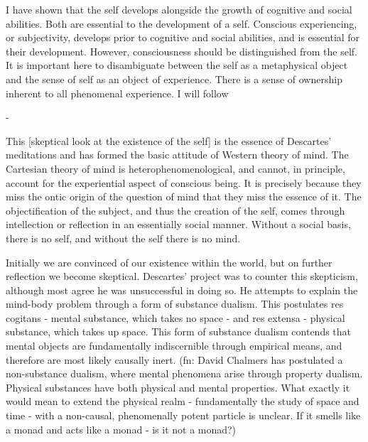 \documentclass[leqno]{article}
\begin{document}
	I have shown that the self develops alongside the growth of cognitive and social
	abilities. Both are essential to the development of a self. Conscious experiencing,
	or subjectivity, develops prior to cognitive and social abilities, and is
	essential for their development. However, consciousness should be
	distinguished from the self. It is important here to disambiguate between the self
	as a metaphysical object and the sense of self as an object of experience.
	There is a sense of ownership inherent to all phenomenal experience. I will follow

	-

	This [skeptical look at the existence of the self] is the essence of Descartes’
	meditations and has formed the basic attitude of Western theory of mind. The
	Cartesian theory of mind is heterophenomenological, and cannot, in principle, account
	for the experiential aspect of conscious being. It is precisely because they
	miss the ontic origin of the question of mind that they miss the essence of it.
	The objectification of the subject, and thus the creation of the self, comes through
	intellection or reflection in an essentially social manner. Without a social
	basis, there is no self, and without the self there is no mind.

	Initially we are convinced of our existence within the world, but on further reflection
	we become skeptical. Descartes’ project was to counter this skepticism, although
	most agree he was unsuccessful in doing so. He attempts to explain the mind-body
	problem through a form of substance dualism. This postulates res cogitans - mental
	substance, which takes no space - and res extensa - physical substance, which takes
	up space. This form of substance dualism contends that mental objects are
	fundamentally indiscernible through empirical means, and therefore are most likely
	causally inert. (fn: David Chalmers has postulated a non-substance dualism, where
	mental phenomena arise through property dualism. Physical substances have both
	physical and mental properties. What exactly it would mean to extend the physical
	realm - fundamentally the study of space and time - with a non-causal,
	phenomenally potent particle is unclear. If it smells like a monad and acts like
	a monad - is it not a monad?)
\end{document}
